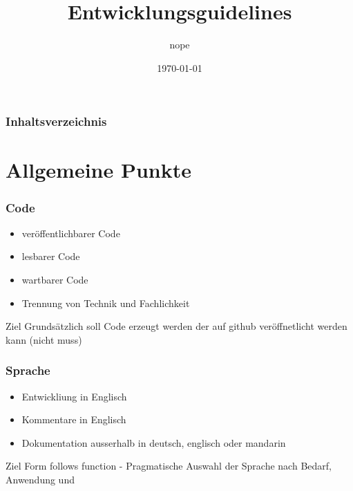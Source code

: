 \documentclass[hyperref={pdfpagelabels=false}]{beamer}
\title{Entwicklungsguidelines}
\author{nope}
\date{\today}
\begin{document}
\begin{frame}
\titlepage
\end{frame} 

\begin{frame}
\frametitle{Inhaltsverzeichnis}
\tableofcontents
\end{frame} 


\section{Allgemeine Punkte} 
\begin{frame}
\frametitle{Code} 
\begin{itemize}
\item veröffentlichbarer Code
\item lesbarer Code
\item wartbarer Code
  \item Trennung von Technik und Fachlichkeit
\end{itemize}
\begin{block}{Ziel}
  Grundsätzlich soll Code erzeugt werden der auf github veröffnetlicht werden kann (nicht muss)
  \end{block}
\end{frame}
\begin{frame}
\frametitle{Sprache} 
\begin{itemize}
\item Entwickliung in Englisch
\item Kommentare in Englisch
\item Dokumentation ausserhalb in deutsch, englisch oder mandarin
\end{itemize}
\begin{block}{Ziel}
  Form follows function - Pragmatische Auswahl der Sprache nach Bedarf, Anwendung und
  \end{block}
\end{frame}
\end{document}
